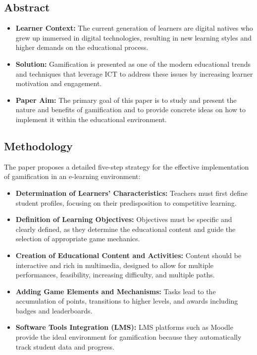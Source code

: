 \documentclass[12pt,a4paper]{report}
\begin{document}
\subsection{Abstract}
\begin{itemize}
  \item \textbf{Learner Context:} The current generation of learners are digital natives who grew up immersed in digital technologies, resulting in new learning styles and higher demands on the educational process.
  \item \textbf{Solution:} Gamification is presented as one of the modern educational trends and techniques that leverage ICT to address these issues by increasing learner motivation and engagement.
  \item \textbf{Paper Aim:} The primary goal of this paper is to study and present the nature and benefits of gamification and to provide concrete ideas on how to implement it within the educational environment.
\end{itemize}

\subsection{Methodology}
The paper proposes a detailed five-step strategy for the effective implementation of gamification in an e-learning environment:
\begin{itemize}
  \item \textbf{Determination of Learners' Characteristics:} Teachers must first define student profiles, focusing on their predisposition to competitive learning.
  \item \textbf{Definition of Learning Objectives:} Objectives must be specific and clearly defined, as they determine the educational content and guide the selection of appropriate game mechanics.
  \item \textbf{Creation of Educational Content and Activities:} Content should be interactive and rich in multimedia, designed to allow for multiple performances, feasibility, increasing difficulty, and multiple paths.
  \item \textbf{Adding Game Elements and Mechanisms:} Tasks lead to the accumulation of points, transitions to higher levels, and awards including badges and leaderboards.
  \item \textbf{Software Tools Integration (LMS):} LMS platforms such as Moodle provide the ideal environment for gamification because they automatically track student data and progress.
\end{itemize}
\end{document}

